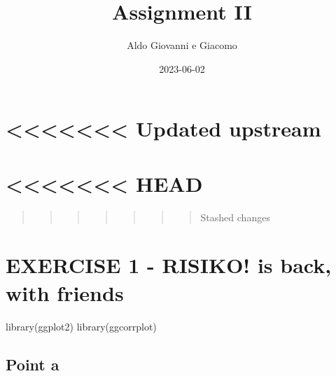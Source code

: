 \documentclass[
]{article}
\title{Assignment II}
\author{Aldo Giovanni e Giacomo}
\date{2023-06-02}
\newenvironment{Shaded}{\begin{snugshade}}{\end{snugshade}}
\newcommand{\FunctionTok}[1]{\textcolor[rgb]{0.00,0.00,0.00}{#1}}
\newcommand{\NormalTok}[1]{#1}
\begin{document}
\maketitle

\hypertarget{updated-upstream}{%
\section{\textless\textless\textless\textless\textless\textless\textless{}
Updated upstream}\label{updated-upstream}}

\hypertarget{head}{%
\section{\textless\textless\textless\textless\textless\textless\textless{}
HEAD}\label{head}}

\begin{quote}
\begin{quote}
\begin{quote}
\begin{quote}
\begin{quote}
\begin{quote}
\begin{quote}
Stashed changes
\end{quote}
\end{quote}
\end{quote}
\end{quote}
\end{quote}
\end{quote}
\end{quote}

\hypertarget{exercise-1---risiko-is-back-with-friends}{%
\section{EXERCISE 1 - RISIKO! is back, with
friends}\label{exercise-1---risiko-is-back-with-friends}}

\begin{Shaded}
\begin{Highlighting}[]
\FunctionTok{library}\NormalTok{(ggplot2)}
\FunctionTok{library}\NormalTok{(ggcorrplot)}
\end{Highlighting}
\end{Shaded}

\hypertarget{point-a}{%
\subsection{Point a}\label{point-a}}
\end{document}
